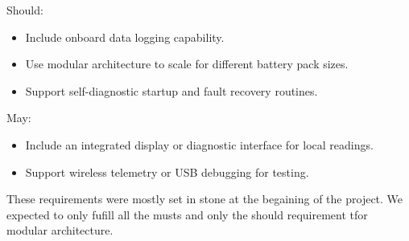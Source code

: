 Should:
\begin{itemize}
	\item Include onboard data logging capability.
	\item Use modular architecture to scale for different battery pack sizes.
	\item Support self-diagnostic startup and fault recovery routines.
\end{itemize}

May:
\begin{itemize}
	\item Include an integrated display or diagnostic interface for local readings.
	\item Support wireless telemetry or USB debugging for testing.
\end{itemize}

These requirements were mostly set in stone at the begaining of the project. We expected to only fufill all the musts and only the should requirement tfor modular architecture.
